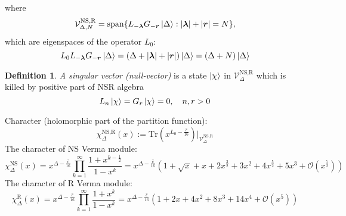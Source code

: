 \documentclass[12pt]{article}
\theoremstyle{definition}
\newtheorem{defin}{Definition}[]
\begin{document}
where
\begin{equation}
    \mathcal{V}^{\text{NS,R}}_{\Delta,N}=\text{span}\{L_{-\bm{\lambda}}G_{-\bm{r}}\ket{\Delta}:|\bm{\lambda}|+|\bm{r}|=N\},
\end{equation}
which are eigenspaces of the operator $L_0$:
\begin{equation}
    L_0L_{-\bm{\lambda}}G_{-\bm{r}}\ket{\Delta}=(\Delta+|\bm{\lambda}|+|\bm{r}|)\ket{\Delta}=(\Delta+N)\ket{\Delta}
\end{equation}
\begin{defin}
    \textit{A singular vector (null-vector)} is a state $\ket{\chi}$ in $\mathcal{V}^{\text{NS,R}}_\Delta$ which is killed by positive part of NSR algebra
    \begin{equation}
        L_n\ket{\chi}=G_r\ket{\chi}=0,\quad n,r>0
    \end{equation}
\end{defin}
Character (holomorphic part of the partition function):
\begin{equation}
    \chi^{\text{NS,R}}_\Delta(x):=\text{Tr}(x^{L_0-\frac{\hat{c}}{16}})|_{\mathcal{V}^{\text{NS,R}}_\Delta}
\end{equation}
The character of NS Verma module:
\begin{equation}
    \chi^{\text{NS}}_{\Delta}(x)=x^{\Delta-\frac{\hat{c}}{16}}\prod\limits_{k=1}^\infty\frac{1+x^{k-\frac{1}{2}}}{1-x^k}=x^{\Delta-\frac{\hat{c}}{16}}(1+\sqrt{x}+x+2x^{\frac{3}{2}}+3x^2+4x^{\frac{5}{2}}+5x^3+\mathcal{O}(x^\frac{7}{2}))
\end{equation}
The character of R Verma module:
\begin{equation}
    \chi^{\text{R}}_\Delta(x)=x^{\Delta-\frac{\hat{c}}{16}}\prod\limits_{k=1}^\infty\frac{1+x^k}{1-x^k}=x^{\Delta-\frac{\hat{c}}{16}}(1+2x+4x^2+8x^3+14x^4+\mathcal{O}(x^5))
\end{equation}
\end{document}
